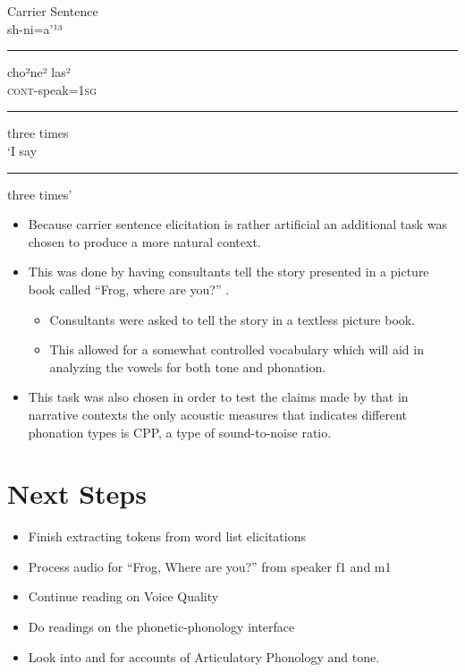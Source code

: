 \documentclass[12pt, letterpaper]{article}
\begin{document}
\ea Carrier Sentence \label{ex:carrier}\\
\gll sh-ni=a'¹³ \rule{10mm}{1pt} cho²ne² las²\\ 
\textsc{cont}-speak=1\textsc{sg} \rule{10mm}{1pt} three times\\
\trans `I say \rule{10mm}{1pt} three times'	
\z 

\begin{itemize}
	\item Because carrier sentence elicitation is rather artificial an additional task was chosen to produce a more natural context. 
	\item This was done by having consultants tell the story presented in a picture book called ``Frog, where are you?'' \citep{mayerFrogWhereAre1969}. 
	\begin{itemize}
		\item Consultants were asked to tell the story in a textless picture book. 
		\item This allowed for a somewhat controlled vocabulary which will aid in analyzing the vowels for both tone and phonation. 
	\end{itemize}
	\item This task was also chosen in order to test the claims made by \citet{garellekPhoneticsWhiteHmong2021} that in narrative contexts the only acoustic measures that indicates different phonation types is CPP, a type of sound-to-noise ratio.
	
\end{itemize}
\section{Next Steps} \label{sec:Methodology}
\begin{itemize}
	\item Finish extracting tokens from word list elicitations
	\item Process audio for ``Frog, Where are you?'' from speaker f1 and m1
	\item Continue reading \citet{eslingVoiceQualityLaryngeal2019} on Voice Quality
	\item Do readings on the phonetic-phonology interface \citep{keatingPhonologyphoneticsInterface1996,zsigaPhonologyPhoneticsInterface2020}
	\item Look into \citet{gaoMandarinTonesArticulatory2008} and \citet{tejadaToneGesturesConstraint2012} for accounts of Articulatory Phonology and tone. 
\end{itemize}
\end{document}
